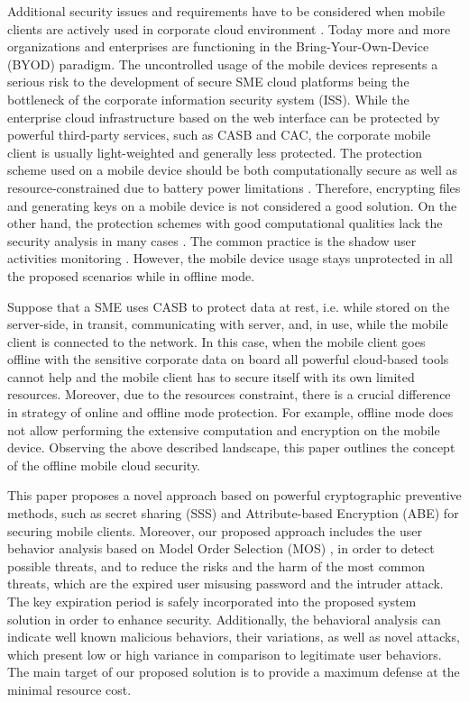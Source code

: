 \documentclass[twocolumn]{svjour3}          	%
\begin{document}
Additional security issues and requirements have to be considered when mobile clients are actively used in corporate cloud environment \cite{yovel2014}. Today more and more organizations and enterprises are functioning in the Bring-Your-Own-Device (BYOD) paradigm. The uncontrolled usage of the mobile devices represents a serious risk to the development of secure SME cloud platforms being the bottleneck of the corporate information security system (ISS). While the enterprise cloud infrastructure based on the web interface can be protected by powerful third-party services, such as CASB and CAC, the corporate mobile client is usually light-weighted and generally less protected. The protection scheme used on a mobile device should be both computationally secure as well as resource-constrained due to battery power limitations \cite{khan2015cloud}. Therefore, encrypting files and generating keys on a mobile device is not considered a good solution. On the other hand, the protection schemes with good computational qualities lack the security analysis in many cases \cite{khan2014bss}. The common practice is the shadow user activities monitoring \cite{yovel2014}. However, the mobile device usage stays unprotected in all the proposed scenarios while in offline mode.

Suppose that a SME uses CASB to protect data at rest, i.e. while stored on the server-side, in transit, communicating with server, and, in use, while the mobile client is connected to the network. In this case, when the mobile client goes offline with the sensitive corporate data on board all powerful cloud-based tools cannot help and the mobile client has to secure itself with its own limited resources. Moreover, due to the resources constraint, there is a crucial difference in strategy of online and offline mode protection. For example, offline mode does not allow performing the extensive computation and encryption on the mobile device.
Observing the above described landscape, this paper outlines the concept of the offline mobile cloud security. 

This paper proposes a novel approach based on powerful cryptographic preventive methods, such as secret sharing (SSS) \cite{galibus2007} and Attribute-based Encryption (ABE) \citep{goyal2006attribute} for securing mobile clients. Moreover, our proposed approach includes the user behavior analysis based on Model Order Selection (MOS) \cite{tenorio2013greatest}, in order to detect possible threats, and to reduce the risks and the harm of the most common threats, which are the expired user misusing password and the intruder attack. The key expiration period is safely incorporated into the proposed system solution in order to enhance security. Additionally, the behavioral analysis can indicate well known malicious behaviors, their variations, as well as novel attacks, which present low or high variance in comparison to legitimate user behaviors. The main target of our proposed solution is to provide a maximum defense at the minimal resource cost.
\end{document}
